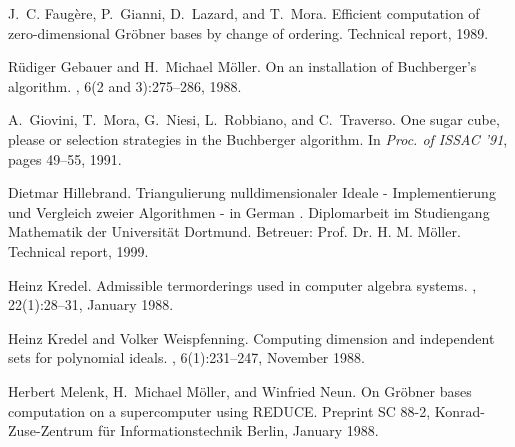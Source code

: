\begin{thebibliography}{10}
J.~C. Faug{\`e}re, P.~Gianni, D.~Lazard, and T.~Mora.
\newblock Efficient computation of zero-dimensional {G}r\"obner bases by change
  of ordering.
\newblock Technical report, 1989.

R{\"u}diger Gebauer and H.~Michael M{\"o}ller.
\newblock On an installation of {B}uchberger's algorithm.
, 6(2 and 3):275--286, 1988.

A.~Giovini, T.~Mora, G.~Niesi, L.~Robbiano, and C.~Traverso.
\newblock One sugar cube, please or selection strategies in the {B}uchberger
  algorithm.
\newblock In {\em Proc. of {ISSAC} '91}, pages 49--55, 1991.

Dietmar Hillebrand.
\newblock Triangulierung nulldimensionaler {I}deale - {I}mplementierung und
  {V}ergleich zweier {A}lgorithmen - in {G}erman . {D}iplomarbeit im
  {S}tudiengang {M}athematik der {U}niversit{\"a}t {D}ortmund. {B}etreuer:
  Prof. {D}r. {H}. {M}. {M}{\"o}ller.
\newblock Technical report, 1999.

Heinz Kredel.
\newblock Admissible termorderings used in computer algebra systems.
, 22(1):28--31, January 1988.

Heinz Kredel and Volker Weispfenning.
\newblock Computing dimension and independent sets for polynomial ideals.
, 6(1):231--247, November 1988.

Herbert Melenk, H.~Michael M{\"o}ller, and Winfried Neun.
\newblock On {G}r{\"o}bner bases computation on a supercomputer using {REDUCE}.
\newblock Preprint SC 88-2, Konrad-Zuse-Zentrum f{\"u}r Informationstechnik
  Berlin, January 1988.

\end{thebibliography}

